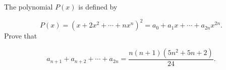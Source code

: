 The polynomial $P(x)$ is defined by

\[
P(x) = (x + 2x^2 + \cdots + nx^n)^2 = a_0 + a_1x + \cdots + a_{2n}x^{2n}.
\]Prove that

\[
a_{n+1} + a_{n+2} + \cdots + a_{2n} = \dfrac{n(n+1)(5n^2 + 5n + 2)}{24}.
\]
